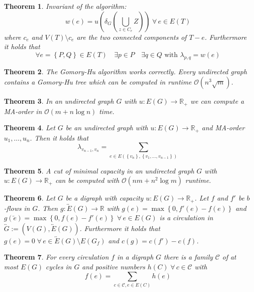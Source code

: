 \documentclass{article}
\newtheorem{theorem}{Theorem}
\newcommand{\set}[1]{\left\{#1\right\}}
\newcommand{\fall}{\;\forall\,}
\begin{document}
\begin{theorem}\label{lemma-4.18}
  Invariant of the algorithm:
  \[
    w(e) = u(\delta_G(\bigcup_{z \in C_e} Z)) \fall e \in E(T)
  \]
  where $c_e$ and $V(T) \setminus c_e$ are the two connected components of $T - e$.
  Furthermore it holds that
  \[
    \forall e = \set{P, Q} \in E(T)
      \quad \exists p \in P
      \quad \exists q \in Q \text{ with } \lambda_{p,q} = w(e)
  \]
\end{theorem}
\begin{theorem}\label{satz-4.19}
  The Gomory-Hu algorithm works correctly.
  Every undirected graph contains a Gomory-Hu tree which can be computed in runtime $\mathcal{O}(n^3 \sqrt{m})$.
\end{theorem}
\begin{theorem}\label{proposition-4.20}
  In an undirected graph $G$ with $u: E(G) \rightarrow \mathbb{R}_+$ we can compute a MA-order in $\mathcal{O}(m + n\log{n})$ time.
\end{theorem}
\begin{theorem}\label{lemma-4.21}
  Let $G$ be an undirected graph with $u: E(G) \rightarrow \mathbb{R}_+$ and MA-order $u_1, \ldots, u_n$.
  Then it holds that
  \[
    \lambda_{v_{n-1}, v_n} = \sum_{e \in E(\set{v_n}, \set{v_1, \ldots, v_{n-1}})}
  \]
\end{theorem}
\begin{theorem}\label{satz-4.22}
  A cut of minimal capacity in an undirected graph $G$ with $u: E(G) \rightarrow \mathbb{R}_+$ can be computed with $\mathcal{O}(nm + n^2 \log{m})$ runtime.
\end{theorem}
\begin{theorem}\label{proposition-5.1}
  Let $G$ be a digraph with capacity $u: E(G) \rightarrow \mathbb{R}_+$. Let $f$ and $f'$ be $b$-flows in $G$. Then $g: \overleftrightarrow{E}(G) \rightarrow \mathbb{R}$ with $g(e) = \max\set{0,f'(e) - f(e)}$ and $g(\overleftarrow{e}) = \max\set{0, f(e) - f'(e)} \fall e \in E(G)$ is a \emph{circulation} in $\overleftrightarrow{G} := (V(G), \overleftrightarrow{E}(G))$. Furthermore it holds that $g(e) = 0 \fall e \in \overleftrightarrow E(G) \setminus E(G_f)$ and $c(g) = c(f') - c(f)$.
\end{theorem}
\begin{theorem}\label{proposition-5.2}
  For every circulation $f$ in a digraph $G$ there is a family $\mathcal{C}$ of at most $E(G)$ cycles in $G$ and positive numbers $h(C) \fall c \in \mathcal{C}$ with
  \[
    f(e) = \sum_{c \in \mathcal{C}, e \in E(C)} h(e)
  \]
\end{theorem}
\end{document}
